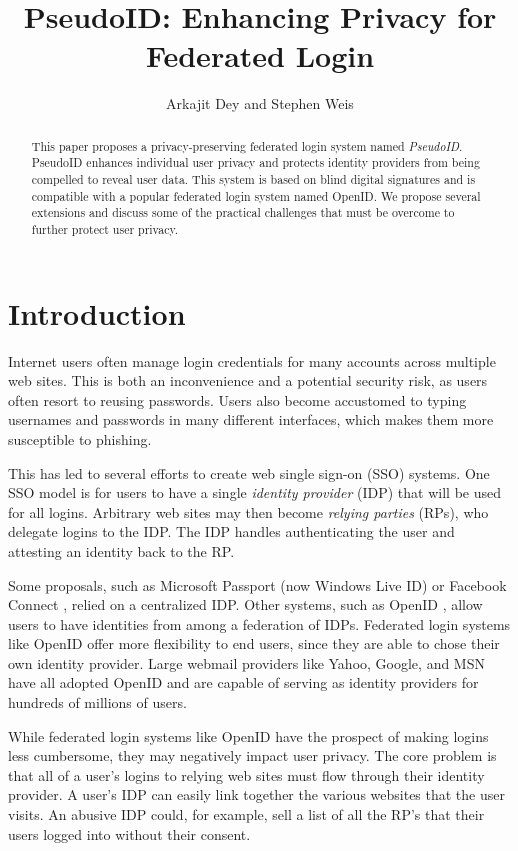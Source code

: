 \documentclass{llncs}
\title{PseudoID: Enhancing Privacy for Federated Login}
\author{Arkajit Dey\inst{1} and Stephen Weis\inst{2}}
\institute{Massachusetts Institute of Technology, Cambridge, MA, USA 02139
\and
Google Inc., Mountain View, CA, USA 94043}
\begin{document}
\maketitle

\begin{abstract}
This paper proposes a privacy-preserving federated login system named
\emph{PseudoID}. PseudoID enhances individual user privacy and
protects identity providers from being compelled to reveal user
data. This system is based on blind digital signatures and is
compatible with a popular federated login system named OpenID. We
propose several extensions and discuss some of the practical
challenges that must be overcome to further protect user privacy.
\end{abstract}

\section{Introduction}
\label{sec:intro}

Internet users often manage login credentials for many accounts across
multiple web sites. This is both an inconvenience and a potential
security risk, as users often resort to reusing passwords. Users also
become accustomed to typing usernames and passwords in many different
interfaces, which makes them more susceptible to phishing.

This has led to several efforts to create web single sign-on (SSO)
systems. One SSO model is for users to have a single \emph{identity
  provider} (IDP) that will be used for all logins. Arbitrary web
sites may then become \emph{relying parties} (RPs), who delegate
logins to the IDP. The IDP handles authenticating the user and
attesting an identity back to the RP.

Some proposals, such as Microsoft Passport (now Windows Live ID)
\cite{MSPass} or Facebook Connect \cite{FBConnect}, relied on a
centralized IDP. Other systems, such as OpenID \cite{OID}, allow users
to have identities from among a federation of IDPs. Federated login
systems like OpenID offer more flexibility to end users, since they
are able to chose their own identity provider. Large webmail providers
like Yahoo, Google, and MSN have all adopted OpenID
\cite{YOP,Sac08,WLOP08} and are capable of serving as identity
providers for hundreds of millions of users.

While federated login systems like OpenID have the prospect of making
logins less cumbersome, they may negatively impact user privacy. The
core problem is that all of a user's logins to relying web sites must
flow through their identity provider. A user's IDP can easily link
together the various websites that the user visits. An abusive IDP
could, for example, sell a list of all the RP's that their users
logged into without their consent.
\end{document}
